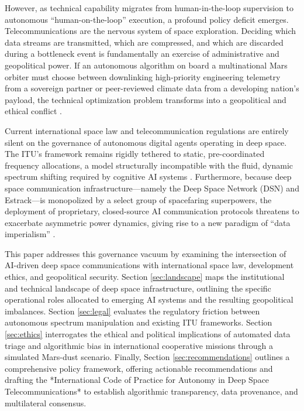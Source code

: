 \documentclass[final,5p,times,twocolumn]{elsarticle}
\begin{document}
However, as technical capability migrates from human-in-the-loop supervision to autonomous ``human-on-the-loop'' execution, a profound policy deficit emerges. Telecommunications are the nervous system of space exploration. Deciding which data streams are transmitted, which are compressed, and which are discarded during a bottleneck event is fundamentally an exercise of administrative and geopolitical power. If an autonomous algorithm on board a multinational Mars orbiter must choose between downlinking high-priority engineering telemetry from a sovereign partner or peer-reviewed climate data from a developing nation's payload, the technical optimization problem transforms into a geopolitical and ethical conflict \citep{marks2022algorithmic}.

Current international space law and telecommunication regulations are entirely silent on the governance of autonomous digital agents operating in deep space. The ITU's framework remains rigidly tethered to static, pre-coordinated frequency allocations, a model structurally incompatible with the fluid, dynamic spectrum shifting required by cognitive AI systems \citep{itu2020radio}. Furthermore, because deep space communication infrastructure---namely the Deep Space Network (DSN) and Estrack---is monopolized by a select group of spacefaring superpowers, the deployment of proprietary, closed-source AI communication protocols threatens to exacerbate asymmetric power dynamics, giving rise to a new paradigm of ``data imperialism'' \citep{escobar2018digital}.

This paper addresses this governance vacuum by examining the intersection of AI-driven deep space communications with international space law, development ethics, and geopolitical security. Section \ref{sec:landscape} maps the institutional and technical landscape of deep space infrastructure, outlining the specific operational roles allocated to emerging AI systems and the resulting geopolitical imbalances. Section \ref{sec:legal} evaluates the regulatory friction between autonomous spectrum manipulation and existing ITU frameworks. Section \ref{sec:ethics} interrogates the ethical and political implications of automated data triage and algorithmic bias in international cooperative missions through a simulated Mars-dust scenario. Finally, Section \ref{sec:recommendations} outlines a comprehensive policy framework, offering actionable recommendations and drafting the *International Code of Practice for Autonomy in Deep Space Telecommunications* to establish algorithmic transparency, data provenance, and multilateral consensus.
\end{document}
